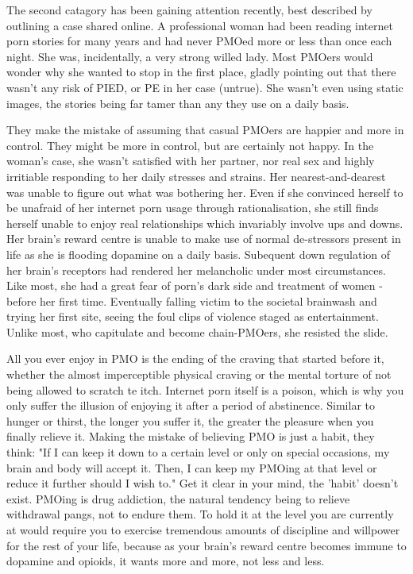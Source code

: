 The second catagory has been gaining attention recently, best described by outlining a case shared online. A professional woman had been reading internet porn stories for many years and had never PMOed more or less than once each night. She was, incidentally, a very strong willed lady. Most PMOers would wonder why she wanted to stop in the first place, gladly pointing out that there wasn't any risk of PIED, or PE in her case (untrue). She wasn't even using static images, the stories being far tamer than any they use on a daily basis.

They make the mistake of assuming that casual PMOers are happier and more in control. They might be more in control, but are certainly not happy. In the woman's case, she wasn't satisfied with her partner, nor real sex and highly irritiable responding to her daily stresses and strains. Her nearest-and-dearest was unable to figure out what was bothering her. Even if she convinced herself to be unafraid of her internet porn usage through rationalisation, she still finds herself unable to enjoy real relationships which invariably involve ups and downs. Her brain's reward centre is unable to make use of normal de-stressors present in life as she is flooding dopamine on a daily basis. Subequent down regulation of her brain's receptors had rendered her melancholic under most circumstances. Like most, she had a great fear of porn's dark side and treatment of women - before her first time. Eventually falling victim to the societal brainwash and trying her first site, seeing the foul clips of violence staged as entertainment. Unlike most, who capitulate and become chain-PMOers, she resisted the slide.

All you ever enjoy in PMO is the ending of the craving that started before it, whether the almost imperceptible physical craving or the mental torture of not being allowed to scratch te itch. Internet porn itself is a poison, which is why you only suffer the illusion of enjoying it after a period of abstinence. Similar to hunger or thirst, the longer you suffer it, the greater the pleasure when you finally relieve it. Making the mistake of believing PMO is just a habit, they think: "If I can keep it down to a certain level or only on special occasions, my brain and body will accept it. Then, I can keep my PMOing at that level or reduce it further should I wish to." Get it clear in your mind, the 'habit' doesn't exist. PMOing is drug addiction, the natural tendency being to relieve withdrawal pangs, not to endure them. To hold it at the level you are currently at would require you to exercise tremendous amounts of discipline and willpower for the rest of your life, because as your brain's reward centre becomes immune to dopamine and opioids, it wants more and more, not less and less. 

